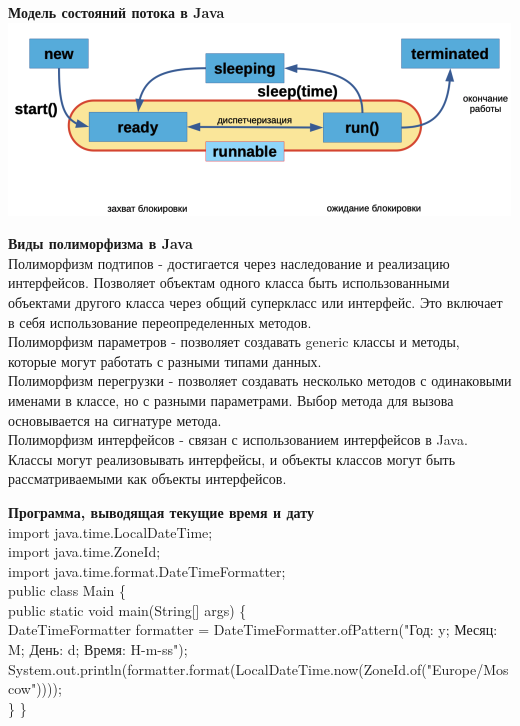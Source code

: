 \documentclass{article}
\begin{document}
\begin{minipage}{.3\textwidth}
    \textbf{Модель состояний потока в Java}\\
    \includegraphics[width=.9\textwidth]{model}
    
\end{minipage}
\hfill
\begin{minipage}{.3\textwidth}
    \textbf{Виды полиморфизма в Java}\\
    Полиморфизм подтипов - достигается через 
    наследование и реализацию интерфейсов. Позволяет объектам одного класса быть 
    использованными объектами другого класса через общий суперкласс или интерфейс. 
    Это включает в себя использование переопределенных методов.\\
    Полиморфизм параметров - позволяет 
    создавать generic классы и методы, которые могут работать с разными типами 
    данных.\\
    Полиморфизм перегрузки - позволяет создавать несколько методов с одинаковыми именами в 
    классе, но с разными параметрами. Выбор метода для вызова основывается на сигнатуре метода.\\
    Полиморфизм интерфейсов - связан с использованием интерфейсов в Java. 
    Классы могут реализовывать интерфейсы, и объекты классов могут быть рассматриваемыми как объекты интерфейсов.
    
\end{minipage}
\hfill
\begin{minipage}{.3\textwidth}
    \textbf{Программа, выводящая текущие время и дату}\\
    import java.time.LocalDateTime;\\
    import java.time.ZoneId;\\
    import java.time.format.DateTimeFormatter;\\

public class Main \{\\
    public static void main(String[] args) \{\\
        DateTimeFormatter formatter = DateTimeFormatter.ofPattern("Год: y; Месяц: M; День: d; Время: H-m-ss");\\
        System.out.println(formatter.format(LocalDateTime.now(ZoneId.of("Europe/Moscow"))));\\
    \}
\}
\end{minipage}
\\ \\
\end{document}

